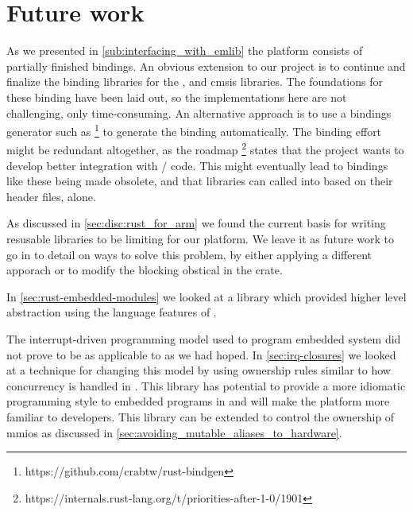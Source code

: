 \section{Future work}
\label{chap:future}

As we presented in \autoref{sub:interfacing_with_emlib} the platform consists of partially finished bindings.
An obvious extension to our project is to continue and finalize the binding libraries for the {\emlib}, {\emdrv} and \gls{cmsis} libraries.
The foundations for these binding have been laid out, so the implementations here are not challenging, only time-consuming.
An alternative approach is to use a bindings generator such as  \footnote{https://github.com/crabtw/rust-bindgen} to generate the binding automatically.
The binding effort might be redundant altogether, as the {\rust} roadmap \footnote{https://internals.rust-lang.org/t/priorities-after-1-0/1901} states that the project wants to develop better integration with {\C}/{\Cpp} code.
This might eventually lead to bindings like these being made obsolete, and that {\C} libraries can called into based on their header files, alone.

As discussed in \autoref{sec:disc:rust_for_arm} we found the current basis for writing resusable libraries to be limiting for our platform.
We leave it as future work to go in to detail on ways to solve this problem, by either applying a different apporach or to modify the blocking obstical in the  crate.

In \autoref{sec:rust-embedded-modules} we looked at a library which provided higher level abstraction using the language features of {\rust}.

The interrupt-driven programming model used to program embedded system did not prove to be as applicable to {\rust} as we had hoped.
In \autoref{sec:irq-closures} we looked at a technique for changing this model by using ownership rules similar to how concurrency is handled in {\rust}.
This library has potential to provide a more idiomatic programming style to embedded programs in {\rust} and will make the platform more familiar to {\rust} developers.
This library can be extended to control the ownership of \glspl{mmio} as discussed in \autoref{sec:avoiding_mutable_aliases_to_hardware}.

